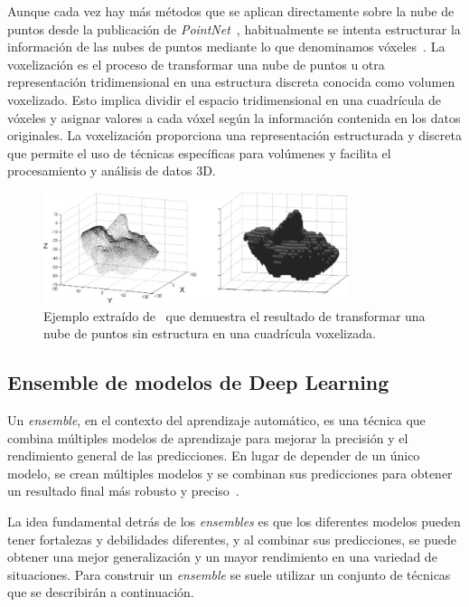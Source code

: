 Aunque cada vez hay más métodos que se aplican directamente sobre la nube de puntos 
desde la publicación de \emph{PointNet}~\cite{PointNet}, habitualmente se 
intenta estructurar la información de las nubes de puntos mediante lo que 
denominamos vóxeles~\cite{VoxelizationExample}. 
La voxelización es el proceso de transformar una nube de puntos u otra representación 
tridimensional en una estructura discreta conocida como volumen voxelizado. 
Esto implica dividir el espacio tridimensional en una cuadrícula de vóxeles y asignar 
valores a cada vóxel según la información contenida en los datos originales. 
La voxelización proporciona una representación estructurada y discreta que permite 
el uso de técnicas específicas para volúmenes y facilita el procesamiento y análisis 
de datos 3D.

\begin{figure}[htp]
  \centering
  \includegraphics[width=0.80\textwidth]{imagenes/chapter2/VoxelizationExample.png}
  \caption[Ejemplo gráfico sobre voxelización.]{Ejemplo extraído de~\cite{VoxelizationExample} que demuestra el resultado 
  de transformar una nube de puntos sin estructura en una cuadrícula voxelizada.}
  \label{fig:VoxelizationExample}
\end{figure}

\subsection{Ensemble de modelos de Deep Learning}
Un \emph{ensemble}, en el contexto del aprendizaje automático, es una técnica que 
combina múltiples modelos de aprendizaje para mejorar la precisión y el rendimiento 
general de las predicciones. En lugar de depender de un único modelo, 
se crean múltiples modelos y se combinan sus predicciones para obtener un resultado 
final más robusto y preciso~\cite{IAModernApproach, DataMiningHandbook, MedicalEnsembleExample}.

La idea fundamental detrás de los \emph{ensembles} es que los diferentes modelos pueden 
tener fortalezas y debilidades diferentes, y al combinar sus predicciones, se 
puede obtener una mejor generalización y un mayor rendimiento en una variedad de 
situaciones. Para construir un \emph{ensemble} se suele utilizar un conjunto 
de técnicas que se describirán a continuación. 

